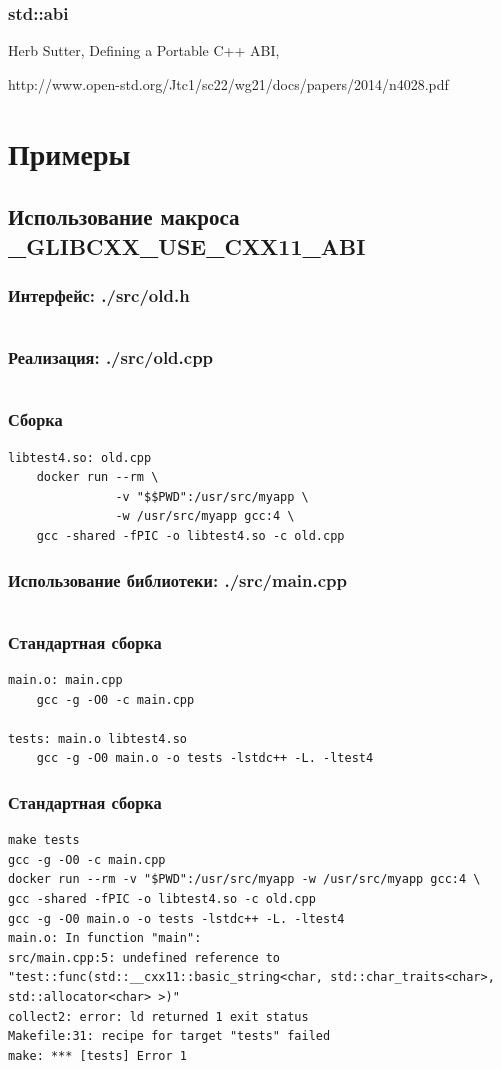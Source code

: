 \documentclass{beamer}
\begin{document}
\begin{frame}[fragile]
\frametitle{std::abi}
 Herb Sutter, Defining a Portable C++ ABI,

 http://www.open-std.org/Jtc1/sc22/wg21/docs/papers/2014/n4028.pdf
\end{frame}

\section{Примеры}

\subsection*{Использование макроса \_GLIBCXX\_USE\_CXX11\_ABI}


\begin{frame}[fragile]
\frametitle{Интерфейс: ./src/old.h}
\inputminted{c++}{../src/old.h}
\end{frame}

\begin{frame}[fragile]
\frametitle{Реализация: ./src/old.cpp}
\inputminted{c++}{../src/old.cpp}
\end{frame}

\begin{frame}[fragile]
\frametitle{Сборка}
\begin{verbatim}
libtest4.so: old.cpp
    docker run --rm \
               -v "$$PWD":/usr/src/myapp \
               -w /usr/src/myapp gcc:4 \
    gcc -shared -fPIC -o libtest4.so -c old.cpp
\end{verbatim}
\end{frame}

\begin{frame}[fragile]
\frametitle{Использование библиотеки: ./src/main.cpp}
\inputminted{c++}{../src/main.cpp}
\end{frame}

\begin{frame}[fragile]
\frametitle{Стандартная сборка}
\begin{verbatim}
main.o: main.cpp
	gcc -g -O0 -c main.cpp 

tests: main.o libtest4.so
	gcc -g -O0 main.o -o tests -lstdc++ -L. -ltest4
\end{verbatim}
\end{frame}

\begin{frame}[fragile]
\frametitle{Стандартная сборка}
\begin{verbatim}
make tests
gcc -g -O0 -c main.cpp 
docker run --rm -v "$PWD":/usr/src/myapp -w /usr/src/myapp gcc:4 \
gcc -shared -fPIC -o libtest4.so -c old.cpp
gcc -g -O0 main.o -o tests -lstdc++ -L. -ltest4
main.o: In function "main":
src/main.cpp:5: undefined reference to 
"test::func(std::__cxx11::basic_string<char, std::char_traits<char>, 
std::allocator<char> >)"
collect2: error: ld returned 1 exit status
Makefile:31: recipe for target "tests" failed
make: *** [tests] Error 1
\end{verbatim}
\end{frame}
\end{document}
